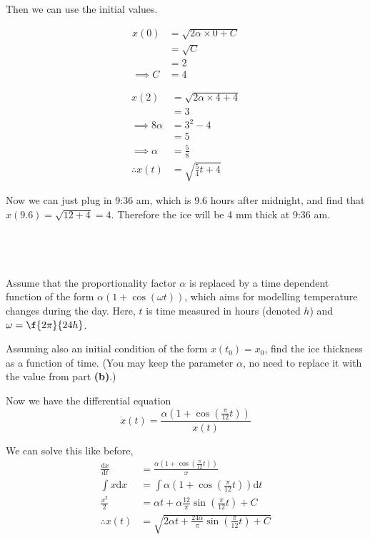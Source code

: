 \documentclass[a4paper]{article}
\begin{document}
Then we can use the initial values.

\begin{align*}
    x(0) &= \sqrt{2 \alpha \times 0 + C} \\
         &= \sqrt C \\
         &= 2 \\
    \implies C &= 4
\end{align*}

\begin{align*}
    x(2) &= \sqrt{2 \alpha \times 4 + 4} \\
         &= 3 \\
    \implies 8 \alpha &= 3^2 - 4 \\
                      &= 5 \\
    \implies \alpha &= \frac58 \\
    \therefore x(t) &= \sqrt{\frac54 t + 4}
\end{align*}

Now we can just plug in 9:36 am, which is $9.6$ hours after midnight, and find that $x(9.6) = \sqrt{12 + 4} = 4$. Therefore the ice will be 4 mm thick at 9:36 am.

\subsection{~} %

\begin{questionbody}
Assume that the proportionality factor $\alpha$ is replaced by a time dependent function of the form $\alpha(1 + \cos(\omega t))$, which aims for modelling temperature changes during the day. Here, $t$ is time measured in hours (denoted $h$) and $\omega = \f{2\pi}{24h}$.

Assuming also an initial condition of the form $x(t_0) = x_0$, find the ice thickness as a function of time. (You may keep the parameter $\alpha$, no need to replace it with the value from part \textbf{(b)}.)
\end{questionbody}

Now we have the differential equation \[ \dot x(t) = \frac{\alpha \left(1 + \cos\left( \frac{\pi}{12} t \right)\right)}{x(t)} \]

We can solve this like before, \begin{align*}
    \frac{\mathrm d x}{\mathrm d t} &= \frac{\alpha \left(1 + \cos\left( \frac{\pi}{12} t \right)\right)}{x} \\[1ex]
    \int x \mathrm d x &= \int \alpha \left( 1 + \cos\left(\frac{\pi}{12} t\right) \right) \mathrm d t \\[1ex]
    \frac{x^2}{2} &= \alpha t + \alpha \frac{12}{\pi} \sin \left(\frac{\pi}{12} t\right) + C \\[1ex]
    \therefore x(t) &= \sqrt{2\alpha t + \frac{24\alpha}{\pi} \sin \left(\frac{\pi}{12} t\right) + C}
\end{align*}
\end{document}
